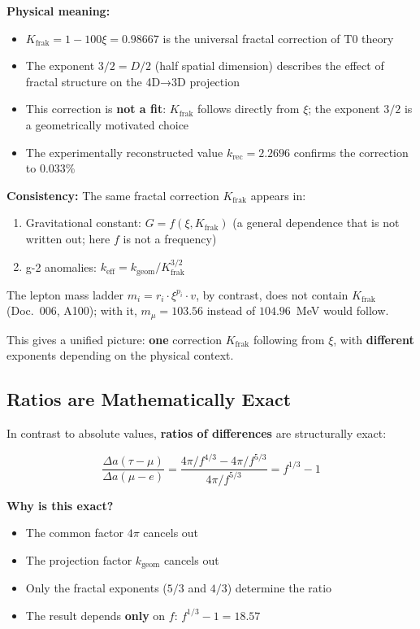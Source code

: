 	\textbf{Physical meaning:}
	\begin{itemize}
		\item $K_\text{frak} = 1 - 100\xi = 0.98667$ is the universal fractal correction of T0 theory
		\item The exponent $3/2 = D/2$ (half spatial dimension) describes the effect of fractal structure on the 4D→3D projection
		\item This correction is \textbf{not a fit}: $K_\text{frak}$ follows directly from $\xi$; the exponent $3/2$ is a geometrically motivated choice
		\item The experimentally reconstructed value $k_\text{rec} = 2.2696$ confirms the correction to 0.033\%
	\end{itemize}
	
	\textbf{Consistency:} The same fractal correction $K_\text{frak}$ appears in:
	\begin{enumerate}
		\item Gravitational constant: $G = f(\xi, K_\text{frak})$ (a general dependence that is not written out; here $f$ is not a frequency)
		\item g-2 anomalies: $k_\text{eff} = k_\text{geom} / K_\text{frak}^{3/2}$
	\end{enumerate}
	The lepton mass ladder $m_i = r_i \cdot \xi^{p_i} \cdot v$, by contrast, does not contain $K_\text{frak}$ (Doc.~006, A100); with it, $m_\mu = 103.56$ instead of $104.96$~MeV would follow.
	
	This gives a unified picture: \textbf{one} correction $K_\text{frak}$ following from $\xi$, with \textbf{different} exponents depending on the physical context.
	
	\subsection{Ratios are Mathematically Exact}
	
	In contrast to absolute values, \textbf{ratios of differences} are structurally exact:
	
	\begin{equation}
		\frac{\Delta a(\tau - \mu)}{\Delta a(\mu - e)} = \frac{4\pi/f^{4/3} - 4\pi/f^{5/3}}{4\pi/f^{5/3}} = f^{1/3} - 1
	\end{equation}
	
	\textbf{Why is this exact?}
	
	\begin{itemize}
		\item The common factor $4\pi$ cancels out
		\item The projection factor $k_{\text{geom}}$ cancels out
		\item Only the fractal exponents ($5/3$ and $4/3$) determine the ratio
		\item The result depends \textbf{only} on $f$: $f^{1/3} - 1 = 18.57$
	\end{itemize}
	
